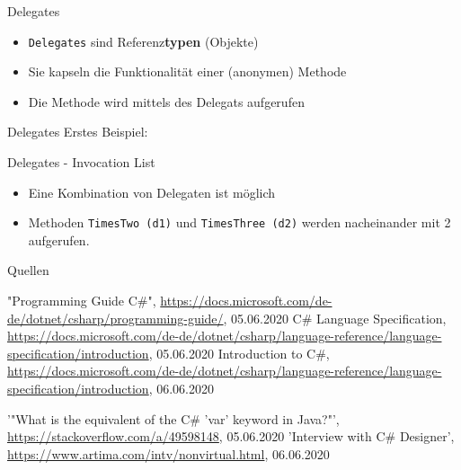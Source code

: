 \documentclass[11pt]{beamer}
\begin{document}
\begin{frame}{Delegates}
\begin{itemize}
 	\item \texttt{Delegates} sind Referenz\textbf{typen} (Objekte)
 	\item Sie kapseln die Funktionalität einer (anonymen) Methode
 	\item Die Methode wird mittels des Delegats aufgerufen
\end{itemize}
	
\end{frame}
\begin{frame}{Delegates}
	Erstes Beispiel:
\end{frame}

\begin{frame}{Delegates - Invocation List}
	\begin{itemize}
		\item  Eine Kombination von Delegaten ist möglich
		\item Methoden \texttt{TimesTwo (d1)} und \texttt{TimesThree (d2)} werden nacheinander mit 2 aufgerufen.
	\end{itemize}
\end{frame}



\begin{frame}{Quellen}
\begin{thebibliography}{99}
\fontsize{6pt}{7.2}\selectfont
	"Programming Guide C\#", \url{https://docs.microsoft.com/de-de/dotnet/csharp/programming-guide/}, 05.06.2020
	 C\# Language Specification, \url{https://docs.microsoft.com/de-de/dotnet/csharp/language-reference/language-specification/introduction}, 05.06.2020
   Introduction to C\#, \url{https://docs.microsoft.com/de-de/dotnet/csharp/language-reference/language-specification/introduction}, 06.06.2020

 '"What is the equivalent of the C\# 'var' keyword in Java?"', 
 \url{https://stackoverflow.com/a/49598148}, 05.06.2020
 'Interview with C\# Designer', \url{https://www.artima.com/intv/nonvirtual.html}, 06.06.2020
\end{thebibliography}
\end{frame}
\end{document}
